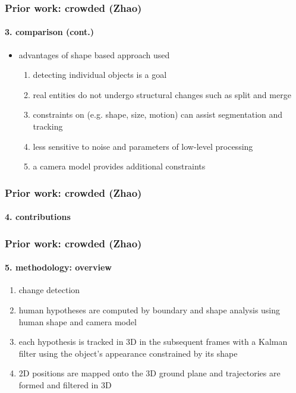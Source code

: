 \begin{frame}
\frametitle{Prior work: crowded (Zhao)}
\framesubtitle{3. comparison (cont.)}
\logoCSIPCPL\mypagenum	
{}
	\begin{itemize}
		\item advantages of shape based approach used
			\begin{enumerate}
				\item detecting individual objects is a goal
				\item real entities do not undergo structural changes such as split and merge
				\item constraints on (e.g. shape, size, motion) can assist segmentation and tracking
				\item less sensitive to noise and parameters of low-level processing
				\item a camera model provides additional constraints
			\end{enumerate}
	\end{itemize}
\end{frame}


\begin{frame}
\frametitle{Prior work: crowded (Zhao)}
\framesubtitle{4. contributions}
\logoCSIPCPL\mypagenum
{}
\end{frame}


\begin{frame}
\frametitle{Prior work: crowded (Zhao)}
\framesubtitle{5. methodology: overview}
\logoCSIPCPL\mypagenum
{}
	\begin{enumerate}
		\item change detection
		\item human hypotheses are computed by boundary and shape analysis using human shape and camera model
		\item each hypothesis is tracked in 3D in the subsequent frames with a Kalman filter using the object's appearance constrained by its shape
		\item 2D positions are mapped onto the 3D ground plane and trajectories are formed and filtered in 3D
	\end{enumerate}
\end{frame}



